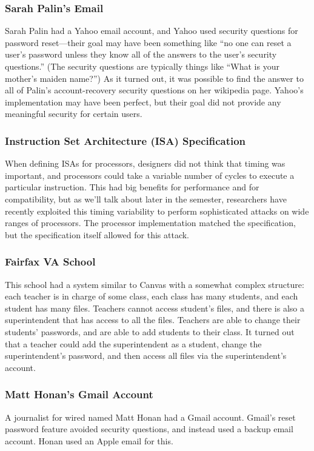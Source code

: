 \subsubsection{Sarah Palin's Email}
Sarah Palin had a Yahoo email account, and Yahoo
used security questions for password reset---their
goal may have been something like ``no one can
reset a user's password unless they know all of
the answers to the user's security questions.''
(The security questions are typically things like
``What is your mother's maiden name?'')
As it turned out, it was possible to find the answer
to all of Palin's account-recovery security questions 
on her wikipedia page.
Yahoo's implementation may have been perfect, but their
goal did not provide any meaningful security for certain users.

\subsubsection{Instruction Set Architecture (ISA) Specification}
When defining ISAs for processors, designers did
not think that timing was important, and
processors could take a variable number of cycles
to execute a particular instruction.
This had big benefits for performance and for
compatibility, but as we'll talk about later in
the semester, researchers have recently exploited
this timing variability to perform sophisticated
attacks on wide ranges of processors. The
processor implementation matched the
specification, but the specification itself
allowed for this attack.

\subsubsection{Fairfax VA School}
This school had a system similar to Canvas with a somewhat complex structure: each teacher is in charge of some class, each class has many students, and each student has many files. Teachers cannot access student's files, and there is also a superintendent that has access to all the files. Teachers are able to change their students' passwords, and are able to add students to their class. It turned out that a teacher could add the superintendent as a student, change the superintendent's password, and then access all files via the superintendent's account.

\subsubsection{Matt Honan's Gmail Account}
A journalist for wired named Matt Honan had a Gmail account. Gmail's reset password feature avoided security questions, and instead used a backup email account. Honan used an Apple email for this.

